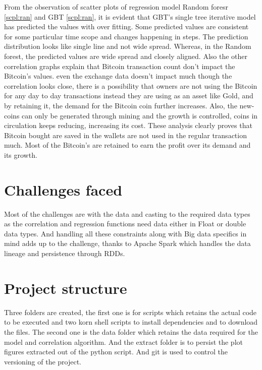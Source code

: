 \documentclass[sigconf]{acmart}
\begin{document}
From the observation of scatter plots of regression model Random foresr \ref{scpl:ran} and GBT \ref{scpl:ran}, it is evident that GBT's single tree iterative model has predicted the values with over fitting. Some predicted values are consistent for some particular time scope and changes happening in steps. The prediction distribution looks like single line and not wide spread. Whereas, in the Random forest, the predicted values are wide spread and closely aligned. Also the other correlation graphs explain that Bitcoin transaction count don't impact the Bitcoin's values. even the exchange data doesn't impact much though the correlation looks close, there is a possibility that owners are not using the Bitcoin for any day to day transactions instead they are using as an asset like Gold, and by retaining it, the demand for the Bitcoin coin further increases. Also, the new-coins can only be generated through mining and the growth is controlled, coins in circulation keeps reducing, increasing its cost.
These analysis clearly proves that Bitcoin bought are saved in the wallets are not used in the regular transaction much. Most of the Bitcoin's are retained to earn the profit over its demand and its growth.


\section{Challenges faced}
Most of the challenges are with the data and casting to the required data types as the correlation and regression functions need data either in Float or double data types. And handling all these constraints along with Big data specifics in mind adds up to the challenge, thanks to Apache Spark which handles the data lineage and persistence through RDDs.

\section{Project structure}
Three folders are created, the first one is for scripts which retains the actual code to be executed and two korn shell scripts to install dependencies and to download the files. The second one is the data folder which retains the data required for the model and correlation algorithm. And the extract folder is to persist the plot figures extracted out of the python script. And git is used to control the versioning of the project. 
\end{document}
